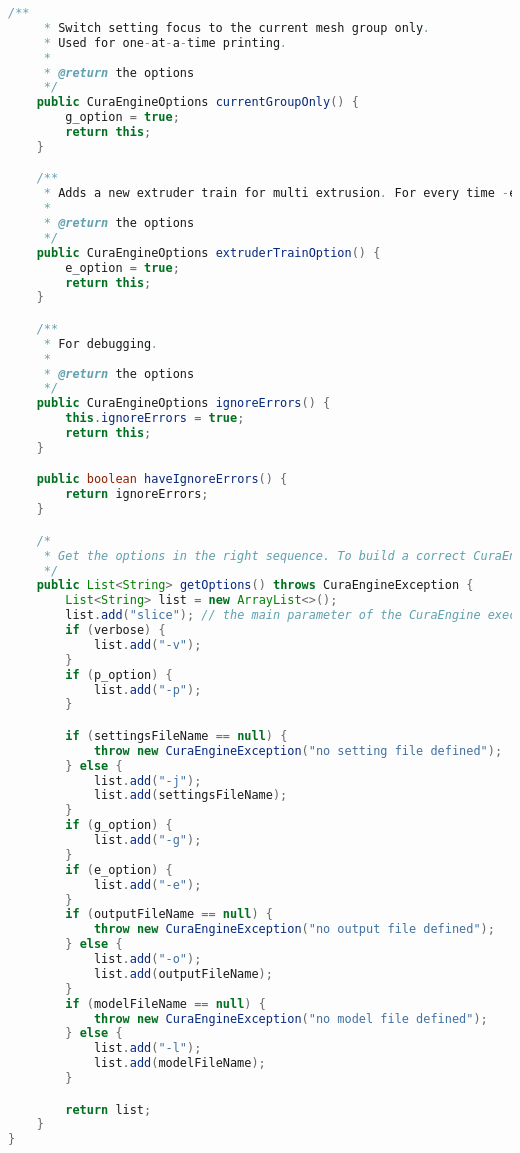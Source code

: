 \begin{lstlisting}[language=Java, label={lst:CuraEngineOptions}, caption=All arguments to the CuraEngine C++ executeable must be compiled before it can be executed. This code is the compiler for that argument list.]
    /**
     * Switch setting focus to the current mesh group only.
     * Used for one-at-a-time printing.
     *
     * @return the options
     */
    public CuraEngineOptions currentGroupOnly() {
        g_option = true;
        return this;
    }

    /**
     * Adds a new extruder train for multi extrusion. For every time -e is included another extruder is added as on option to the slicer.
     *
     * @return the options
     */
    public CuraEngineOptions extruderTrainOption() {
        e_option = true;
        return this;
    }

    /**
     * For debugging.
     *
     * @return the options
     */
    public CuraEngineOptions ignoreErrors() {
        this.ignoreErrors = true;
        return this;
    }

    public boolean haveIgnoreErrors() {
        return ignoreErrors;
    }

    /*
     * Get the options in the right sequence. To build a correct CuraEngine command line executable.
     */
    public List<String> getOptions() throws CuraEngineException {
        List<String> list = new ArrayList<>();
        list.add("slice"); // the main parameter of the CuraEngine executable.
        if (verbose) {
            list.add("-v");
        }
        if (p_option) {
            list.add("-p");
        }

        if (settingsFileName == null) {
            throw new CuraEngineException("no setting file defined");
        } else {
            list.add("-j");
            list.add(settingsFileName);
        }
        if (g_option) {
            list.add("-g");
        }
        if (e_option) {
            list.add("-e");
        }
        if (outputFileName == null) {
            throw new CuraEngineException("no output file defined");
        } else {
            list.add("-o");
            list.add(outputFileName);
        }
        if (modelFileName == null) {
            throw new CuraEngineException("no model file defined");
        } else {
            list.add("-l");
            list.add(modelFileName);
        }

        return list;
    }
}
\end{lstlisting}


